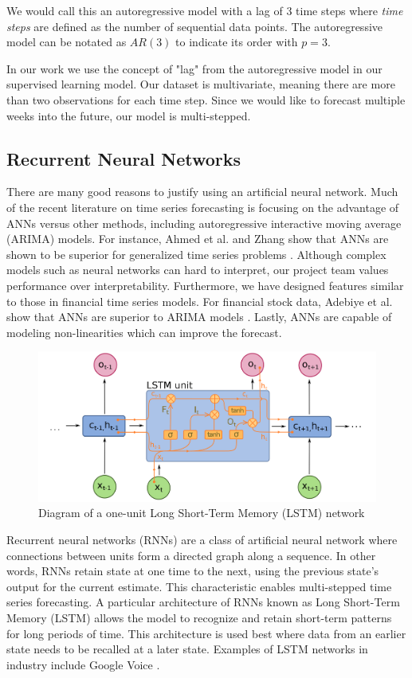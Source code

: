 \documentclass[11pt, oneside]{article}
\begin{document}
We would call this an autoregressive model with a lag of 3 time steps where \textit{time steps} are defined as the number of sequential data points. The autoregressive model can be notated as $AR(3)$ to indicate its order with $p=3$.

In our work we use the concept of "lag" from the autoregressive model in our supervised learning model. Our dataset is multivariate, meaning there are more than two observations for each time step. Since we would like to forecast multiple weeks into the future, our model is multi-stepped.

\subsection{Recurrent Neural Networks}

There are many good reasons to justify using an artificial neural network. Much of the recent literature on time series forecasting is focusing on the advantage of ANNs versus other methods, including autoregressive interactive moving average (ARIMA) models. For instance, Ahmed et al. and Zhang show that ANNs are shown to be superior for generalized time series problems \cite{ahmed et al.}. Although complex models such as neural networks can hard to interpret, our project team values performance over interpretability. Furthermore, we have designed features similar to those in financial time series models. For financial stock data, Adebiye et al. show that ANNs are superior to ARIMA models \cite{adebiye et al.}. Lastly, ANNs are capable of modeling non-linearities which can improve the forecast.

\begin{figure}[h]
  \caption{Diagram of a one-unit Long Short-Term Memory (LSTM) network}
  \centering
  \includegraphics[width=12.5cm]{images/Long_Short-Term_Memory.png}
\end{figure}

Recurrent neural networks (RNNs) are a class of artificial neural network where connections between units form a directed graph along a sequence. In other words, RNNs retain state at one time to the next, using the previous state's output for the current estimate. This characteristic enables multi-stepped time series forecasting. A particular architecture of RNNs known as Long Short-Term Memory (LSTM) allows the model to recognize and retain short-term patterns for long periods of time. This architecture is used best where data from an earlier state needs to be recalled at a later state. Examples of LSTM networks in industry include Google Voice \cite{beaufays}.
\end{document}

